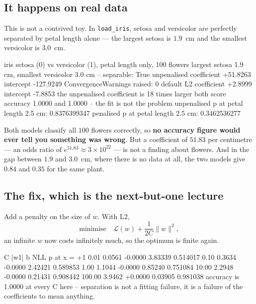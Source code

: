 \documentclass[11pt]{article}
\begin{document}
\subsection{It happens on real data}
\label{sec:sepreal}

This is not a contrived toy. In \texttt{load\_iris}, setosa and versicolor are
perfectly separated by petal length alone --- the largest setosa is $1.9$~cm
and the smallest versicolor is $3.0$~cm.

\begin{codeout}
iris setosa (0) vs versicolor (1), petal length only, 100 flowers
   largest setosa 1.9 cm, smallest versicolor 3.0 cm -- separable: True
   unpenalised   coefficient     +51.8263  intercept    -127.9249
   ConvergenceWarnings raised: 0
   default L2    coefficient      +2.8999  intercept      -7.8853
   the unpenalised coefficient is 18 times larger
   both score accuracy 1.0000 and 1.0000 -- the fit is not the problem
   unpenalised p at petal length 2.5 cm: 0.8376399347
   penalised    p at petal length 2.5 cm: 0.3462536277
\end{codeout}

Both models classify all $100$ flowers correctly, so \textbf{no accuracy
figure would ever tell you something was wrong}. But a coefficient of $51.83$
per centimetre --- an odds ratio of $e^{51.83} \approx 3\times10^{22}$ --- is
not a finding about flowers. And in the gap between $1.9$ and $3.0$~cm, where
there is no data at all, the two models give $0.84$ and $0.35$ for the same
plant.

\subsection{The fix, which is the next-but-one lecture}

Add a penalty on the size of $w$. With L2,
\[
  \text{minimise}\quad \mathcal{L}(w) + \frac{1}{2C}\lVert w \rVert^{2} ,
\]
an infinite $w$ now costs infinitely much, so the optimum is finite again.

\begin{codeout}
       C      |w1|       b        NLL      p at x = +1
    0.01    0.0561  -0.0000   3.83339    0.514017
    0.10    0.3634  -0.0000   2.42421    0.589853
    1.00    1.1044  -0.0000   0.85240    0.751084
   10.00    2.2948  -0.0000   0.21431    0.908442
  100.00    3.9462  +0.0000   0.03905    0.981038
accuracy is 1.0000 at every C here -- separation is not a fitting
failure, it is a failure of the coefficients to mean anything.
\end{codeout}
\end{document}
